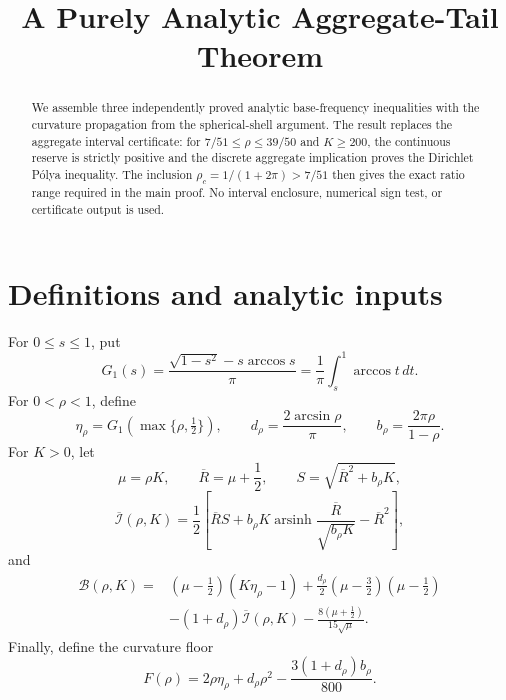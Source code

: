 \documentclass[11pt]{article}
\title{A Purely Analytic Aggregate-Tail Theorem}
\author{}
\date{}
\newcommand{\Bcal}{\mathcal B}
\newcommand{\Ibar}{\overline{\mathcal I}}
\newcommand{\Rbar}{\overline R}
\begin{document}
\maketitle

\begin{abstract}
We assemble three independently proved analytic base-frequency inequalities
with the curvature propagation from the spherical-shell argument.  The
result replaces the aggregate interval certificate: for
\(7/51\leq\rho\leq39/50\) and \(K\geq200\), the continuous reserve is
strictly positive and the discrete aggregate implication proves the
Dirichlet P\'olya inequality.  The inclusion
\(\rho_c=1/(1+2\pi)>7/51\) then gives the exact ratio range required in the
main proof.  No interval enclosure, numerical sign test, or certificate
output is used.
\end{abstract}

\section{Definitions and analytic inputs}

For \(0\leq s\leq1\), put
\[
 G_1(s)=\frac{\sqrt{1-s^2}-s\arccos s}{\pi}
       =\frac1\pi\int_s^1\arccos t\,dt.
\]
For \(0<\rho<1\), define
\[
 \eta_\rho=G_1\!\left(\max\{\rho,\tfrac12\}\right),
 \qquad
 d_\rho=\frac{2\arcsin\rho}{\pi},
 \qquad
 b_\rho=\frac{2\pi\rho}{1-\rho}.
\]
For \(K>0\), let
\[
 \mu=\rho K,\qquad
 \Rbar=\mu+\frac12,\qquad
 S=\sqrt{\Rbar^2+b_\rho K},
\]
\begin{equation}
 \Ibar(\rho,K)
 =\frac12\left[
  \Rbar S+b_\rho K\operatorname{arsinh}
       \frac{\Rbar}{\sqrt{b_\rho K}}
  -\Rbar^2\right],
 \label{eq:Ibar}
\end{equation}
and
\begin{equation}
\begin{aligned}
 \Bcal(\rho,K)={}&
 (\mu-\tfrac12)(K\eta_\rho-1)
 +\frac{d_\rho}{2}(\mu-\tfrac32)(\mu-\tfrac12)\\
 &-(1+d_\rho)\Ibar(\rho,K)
 -\frac{8(\mu+\tfrac12)}{15\sqrt\mu}.
\end{aligned}
\label{eq:B}
\end{equation}
Finally, define the curvature floor
\begin{equation}
 F(\rho)=2\rho\eta_\rho+d_\rho\rho^2
 -\frac{3(1+d_\rho)b_\rho}{800}.
 \label{eq:F}
\end{equation}
\end{document}
